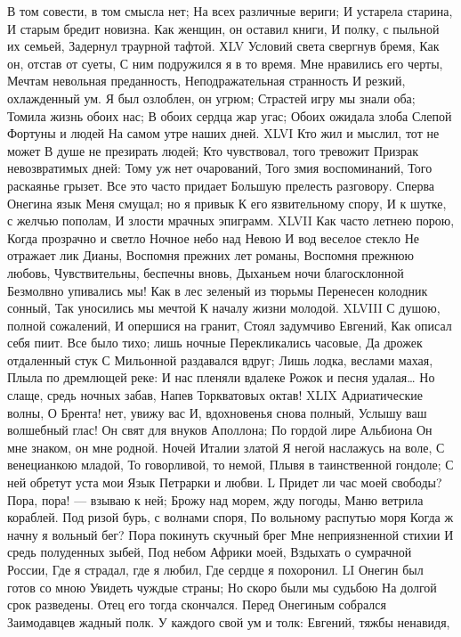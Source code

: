 В том совести, в том смысла нет;
На всех различные вериги;
И устарела старина,
И старым бредит новизна.
Как женщин, он оставил книги,
И полку, с пыльной их семьей,
Задернул траурной тафтой.
ХLV
Условий света свергнув бремя,
Как он, отстав от суеты,
С ним подружился я в то время.
Мне нравились его черты,
Мечтам невольная преданность,
Неподражательная странность
И резкий, охлажденный ум.
Я был озлоблен, он угрюм;
Страстей игру мы знали оба;
Томила жизнь обоих нас;
В обоих сердца жар угас;
Обоих ожидала злоба
Слепой Фортуны и людей
На самом утре наших дней.
XLVI
Кто жил и мыслил, тот не может
В душе не презирать людей;
Кто чувствовал, того тревожит
Призрак невозвратимых дней:
Тому уж нет очарований,
Того змия воспоминаний,
Того раскаянье грызет.
Все это часто придает
Большую прелесть разговору.
Сперва Онегина язык
Меня смущал; но я привык
К его язвительному спору,
И к шутке, с желчью пополам,
И злости мрачных эпиграмм.
XLVII
Как часто летнею порою,
Когда прозрачно и светло
Ночное небо над Невою
И вод веселое стекло
Не отражает лик Дианы,
Воспомня прежних лет романы,
Воспомня прежнюю любовь,
Чувствительны, беспечны вновь,
Дыханьем ночи благосклонной
Безмолвно упивались мы!
Как в лес зеленый из тюрьмы
Перенесен колодник сонный,
Так уносились мы мечтой
К началу жизни молодой.
XLVIII
С душою, полной сожалений,
И опершися на гранит,
Стоял задумчиво Евгений,
Как описал себя пиит.
Все было тихо; лишь ночные
Перекликались часовые,
Да дрожек отдаленный стук
С Мильонной раздавался вдруг;
Лишь лодка, веслами махая,
Плыла по дремлющей реке:
И нас пленяли вдалеке
Рожок и песня удалая…
Но слаще, средь ночных забав,
Напев Торкватовых октав!
XLIX
Адриатические волны,
О Брента! нет, увижу вас
И, вдохновенья снова полный,
Услышу ваш волшебный глас!
Он свят для внуков Аполлона;
По гордой лире Альбиона
Он мне знаком, он мне родной.
Ночей Италии златой
Я негой наслажусь на воле,
С венецианкою младой,
То говорливой, то немой,
Плывя в таинственной гондоле;
С ней обретут уста мои
Язык Петрарки и любви.
L
Придет ли час моей свободы?
Пора, пора! — взываю к ней;
Брожу над морем, жду погоды,
Маню ветрила кораблей.
Под ризой бурь, с волнами споря,
По вольному распутью моря
Когда ж начну я вольный бег?
Пора покинуть скучный брег
Мне неприязненной стихии
И средь полуденных зыбей,
Под небом Африки моей,
Вздыхать о сумрачной России,
Где я страдал, где я любил,
Где сердце я похоронил.
LI
Онегин был готов со мною
Увидеть чуждые страны;
Но скоро были мы судьбою
На долгой срок разведены.
Отец его тогда скончался.
Перед Онегиным собрался
Заимодавцев жадный полк.
У каждого свой ум и толк:
Евгений, тяжбы ненавидя,
